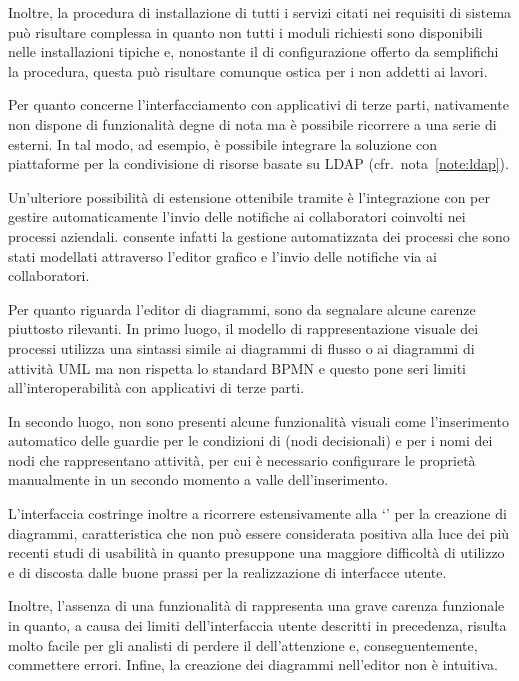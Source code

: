 Inoltre, la procedura di installazione di tutti i servizi citati nei requisiti di sistema può risultare complessa in quanto non tutti i moduli richiesti sono disponibili nelle installazioni tipiche e, nonostante il  di configurazione offerto da \progname semplifichi la procedura, questa può risultare comunque ostica per i non addetti ai lavori.

Per quanto concerne l'interfacciamento con applicativi di terze parti, \progname nativamente non dispone di funzionalità degne di nota ma è possibile ricorrere a una serie di  esterni. In tal modo, ad esempio, è possibile integrare la soluzione con piattaforme per la condivisione di risorse basate su LDAP (cfr.~nota~\ref{note:ldap}).

Un'ulteriore possibilità di estensione ottenibile tramite  è l'integrazione con  per gestire automaticamente l'invio delle notifiche ai collaboratori coinvolti nei processi aziendali. \progname consente infatti la gestione automatizzata dei processi che sono stati modellati attraverso l'editor grafico e l'invio delle notifiche	via  ai collaboratori.

Per quanto riguarda l'editor di diagrammi, sono da segnalare alcune carenze piuttosto rilevanti. In primo luogo, il modello di rappresentazione visuale dei processi utilizza una sintassi simile ai diagrammi di flusso o ai diagrammi di attività UML ma non rispetta lo standard BPMN e questo pone seri limiti all'interoperabilità con applicativi di terze parti. 

In secondo luogo, non sono presenti alcune funzionalità visuali come l'inserimento automatico delle guardie per le condizioni di  (nodi decisionali) e per i nomi dei nodi che rappresentano attività, per cui è necessario configurare le proprietà manualmente in un secondo momento a valle dell'inserimento.

L'interfaccia  costringe inoltre a ricorrere estensivamente alla  `' per la creazione di diagrammi, caratteristica che non può essere considerata positiva alla luce dei più recenti studi di usabilità in quanto presuppone una maggiore difficoltà di utilizzo e di discosta dalle buone prassi per la realizzazione di interfacce utente.

Inoltre, l'assenza di una funzionalità di  rappresenta una grave carenza funzionale in quanto, a causa dei limiti dell'interfaccia utente descritti in precedenza, risulta molto facile per gli analisti di \bsn perdere il  dell'attenzione e, conseguentemente, commettere errori. Infine, la creazione dei diagrammi nell'editor non è intuitiva.


